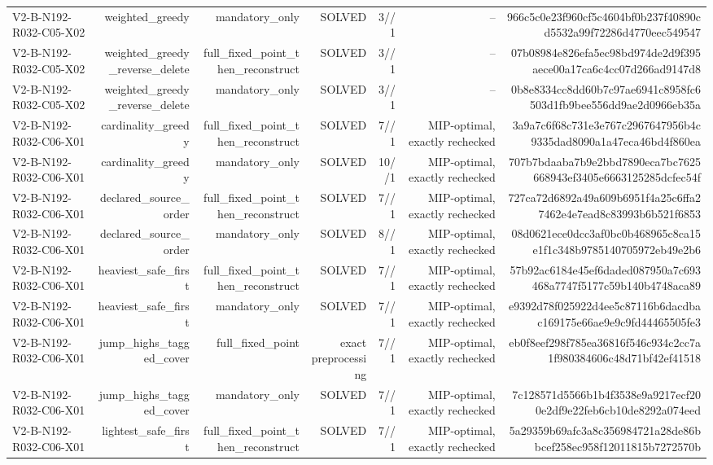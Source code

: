 {\begin{longtable}{lrrrrrr}
V2-B-N192-R032-C05-X02 & weighted\_greedy & mandatory\_only & SOLVED & 3//1 & -- & 966c5c0e23f960cf5c4604bf0b237f40890cd5532a99f72286d4770eec549547 \\
V2-B-N192-R032-C05-X02 & weighted\_greedy\_reverse\_delete & full\_fixed\_point\_then\_reconstruct & SOLVED & 3//1 & -- & 07b08984e826efa5ec98bd974de2d9f395aece00a17ca6c4cc07d266ad9147d8 \\
V2-B-N192-R032-C05-X02 & weighted\_greedy\_reverse\_delete & mandatory\_only & SOLVED & 3//1 & -- & 0b8e8334cc8dd60b7c97ae6941c8958fc6503d1fb9bee556dd9ae2d0966eb35a \\
V2-B-N192-R032-C06-X01 & cardinality\_greedy & full\_fixed\_point\_then\_reconstruct & SOLVED & 7//1 & MIP-optimal, exactly rechecked & 3a9a7c6f68c731e3e767c2967647956b4c9335dad8090a1a47eca46bd4f860ea \\
V2-B-N192-R032-C06-X01 & cardinality\_greedy & mandatory\_only & SOLVED & 10//1 & MIP-optimal, exactly rechecked & 707b7bdaaba7b9e2bbd7890eca7bc7625668943ef3405e6663125285dcfec54f \\
V2-B-N192-R032-C06-X01 & declared\_source\_order & full\_fixed\_point\_then\_reconstruct & SOLVED & 7//1 & MIP-optimal, exactly rechecked & 727ca72d6892a49a609b6951f4a25c6ffa27462e4e7ead8c83993b6b521f6853 \\
V2-B-N192-R032-C06-X01 & declared\_source\_order & mandatory\_only & SOLVED & 8//1 & MIP-optimal, exactly rechecked & 08d0621ece0dcc3af0bc0b468965c8ca15e1f1c348b9785140705972eb49e2b6 \\
V2-B-N192-R032-C06-X01 & heaviest\_safe\_first & full\_fixed\_point\_then\_reconstruct & SOLVED & 7//1 & MIP-optimal, exactly rechecked & 57b92ac6184e45ef6daded087950a7c693468a7747f5177c59b140b4748aca89 \\
V2-B-N192-R032-C06-X01 & heaviest\_safe\_first & mandatory\_only & SOLVED & 7//1 & MIP-optimal, exactly rechecked & e9392d78f025922d4ee5c87116b6dacdbac169175e66ae9e9c9fd44465505fe3 \\
V2-B-N192-R032-C06-X01 & jump\_highs\_tagged\_cover & full\_fixed\_point & exact preprocessing & 7//1 & MIP-optimal, exactly rechecked & eb0f8eef298f785ea36816f546c934c2cc7a1f980384606c48d71bf42ef41518 \\
V2-B-N192-R032-C06-X01 & jump\_highs\_tagged\_cover & mandatory\_only & SOLVED & 7//1 & MIP-optimal, exactly rechecked & 7c128571d5566b1b4f3538e9a9217ecf200e2df9e22feb6cb10de8292a074eed \\
V2-B-N192-R032-C06-X01 & lightest\_safe\_first & full\_fixed\_point\_then\_reconstruct & SOLVED & 7//1 & MIP-optimal, exactly rechecked & 5a29359b69afc3a8c356984721a28de86bbcef258ec958f12011815b7272570b \\

\end{longtable}}
